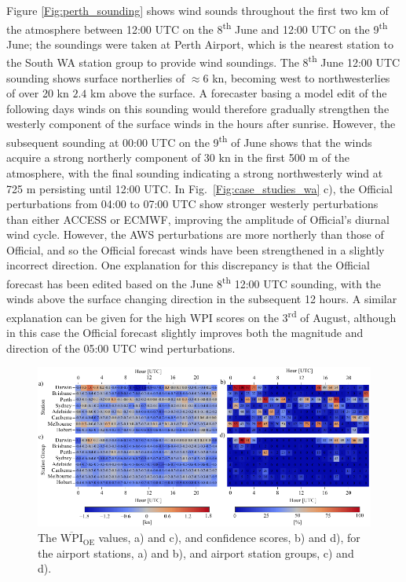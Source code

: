 \documentclass{ametsoc}
\begin{document}
Figure \ref{Fig:perth_sounding} shows wind sounds throughout the first two km of the atmosphere between 12:00 UTC on the 8\textsuperscript{th} June and 12:00 UTC on the 9\textsuperscript{th} June; the soundings were taken at Perth Airport, which is the nearest station to the South WA station group to provide wind soundings. The 8\textsuperscript{th} June 12:00 UTC sounding shows surface northerlies of $\approx 6$ kn, becoming west to northwesterlies of over 20 kn $2.4$ km above the surface. A forecaster basing a model edit of the following days winds on this sounding would therefore gradually strengthen the westerly component of the surface winds in the hours after sunrise. However, the subsequent sounding at 00:00 UTC on the 9\textsuperscript{th} of June shows that the winds acquire a strong northerly component of 30 kn in the first 500 m of the atmosphere, with the final sounding indicating a strong northwesterly wind at 725 m persisting until 12:00 UTC. In Fig.~\ref{Fig:case_studies_wa} c), the Official perturbations from 04:00 to 07:00 UTC show stronger westerly perturbations than either ACCESS or ECMWF, improving the amplitude of Official's diurnal wind cycle. However, the AWS perturbations are more northerly than those of Official, and so the Official forecast winds have been strengthened in a slightly incorrect direction. One explanation for this discrepancy is that the Official forecast has been edited based on the June 8\textsuperscript{th} 12:00 UTC sounding, with the winds above the surface changing direction in the subsequent 12 hours. A similar explanation can be given for the high WPI scores on the  3\textsuperscript{rd} of August, although in this case the Official forecast slightly improves both the magnitude and direction of the 05:00 UTC wind perturbations.

\begin{figure}
\centering
\includegraphics[width=39pc]{airport_wpi.pdf}
\caption{The $\overline{\text{WPI}}_\text{OE}$ values, a) and c), and confidence scores, b) and d), for the airport stations, a) and b), and airport station groups, c) and d).}
\label{Fig:airport_wpi}
\end{figure}
\end{document}
